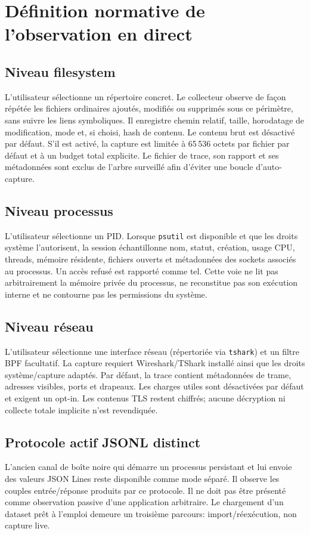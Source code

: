 \documentclass[11pt,a4paper]{article}
\begin{document}
\section{Définition normative de l'observation en direct}
\subsection{Niveau filesystem}
L'utilisateur sélectionne un répertoire concret. Le collecteur observe de façon répétée les fichiers ordinaires ajoutés, modifiés ou supprimés sous ce périmètre, sans suivre les liens symboliques. Il enregistre chemin relatif, taille, horodatage de modification, mode et, si choisi, hash de contenu. Le contenu brut est désactivé par défaut. S'il est activé, la capture est limitée à 65\,536 octets par fichier par défaut et à un budget total explicite. Le fichier de trace, son rapport et ses métadonnées sont exclus de l'arbre surveillé afin d'éviter une boucle d'auto-capture.

\subsection{Niveau processus}
L'utilisateur sélectionne un PID. Lorsque \texttt{psutil} est disponible et que les droits système l'autorisent, la session échantillonne nom, statut, création, usage CPU, threads, mémoire résidente, fichiers ouverts et métadonnées des sockets associés au processus. Un accès refusé est rapporté comme tel. Cette voie ne lit pas arbitrairement la mémoire privée du processus, ne reconstitue pas son exécution interne et ne contourne pas les permissions du système.

\subsection{Niveau réseau}
L'utilisateur sélectionne une interface réseau (répertoriée via \texttt{tshark}) et un filtre BPF facultatif. La capture requiert Wireshark/TShark installé ainsi que les droits système/capture adaptés. Par défaut, la trace contient métadonnées de trame, adresses visibles, ports et drapeaux. Les charges utiles sont désactivées par défaut et exigent un opt-in. Les contenus TLS restent chiffrés; aucune décryption ni collecte totale implicite n'est revendiquée.

\subsection{Protocole actif JSONL distinct}
L'ancien canal de boîte noire qui démarre un processus persistant et lui envoie des valeurs JSON Lines reste disponible comme mode séparé. Il observe les couples entrée/réponse produits par ce protocole. Il ne doit pas être présenté comme observation passive d'une application arbitraire. Le chargement d'un dataset prêt à l'emploi demeure un troisième parcours: import/réexécution, non capture live.
\end{document}
